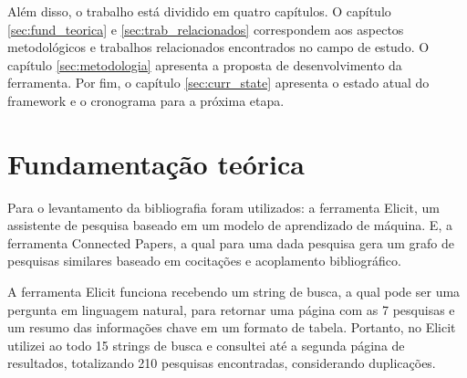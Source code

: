 \documentclass[12pt]{tcc}
\begin{document}
Além disso, o trabalho está dividido em quatro capítulos.
O capítulo \ref{sec:fund_teorica} e \ref{sec:trab_relacionados} correspondem aos aspectos metodológicos e trabalhos relacionados encontrados no campo de estudo.
O capítulo \ref{sec:metodologia} apresenta a proposta de desenvolvimento da ferramenta.
Por fim, o capítulo \ref{sec:curr_state} apresenta o estado atual do framework e o cronograma para a próxima etapa.


\chapter{Fundamentação teórica}
\label{sec:background}
	\label{sec:fund_teorica}

Para o levantamento da bibliografia foram utilizados: 
a ferramenta Elicit, um assistente de pesquisa baseado em um modelo  de aprendizado de máquina.
E, a ferramenta Connected Papers, a qual para uma dada pesquisa gera um grafo de pesquisas similares baseado em cocitações e acoplamento bibliográfico.

A ferramenta Elicit funciona recebendo um string de busca, a qual pode ser uma pergunta em linguagem natural, para retornar uma página com as 7 pesquisas e um resumo das informações chave em um formato de tabela.
Portanto, no Elicit utilizei ao todo 15 strings de busca e consultei até a segunda página de resultados, totalizando 210 pesquisas encontradas, considerando duplicações.
\end{document}
